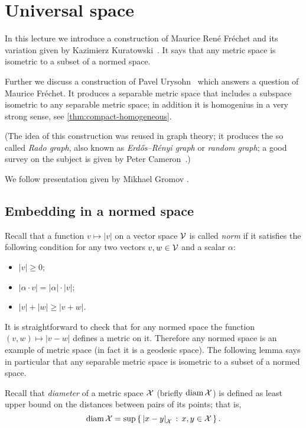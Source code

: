 \chapter{Universal space}

In this lecture we introduce a construction of Maurice René Fréchet \cite{frechet} and its variation given by Kazimierz Kuratowski~\cite{kuratowski}.
It says that any metric space is isometric to a subset of a normed space.

Further we discuss a construction of Pavel Urysohn~\cite{urysohn} which answers a question of Maurice Fréchet.
It produces a separable metric space that includes a subspace  isometric to any separable metric space; in addition it is homogenius in a very strong sense, see \ref{thm:compact-homogeneous}.

(The idea of this construction was reused in graph theory; it produces the so called \emph{Rado graph},
also known as \emph{Erd\H{o}s–R\'enyi graph} or \emph{random graph}; a good survey on the subject is given by Peter Cameron~\cite{cameron}.)

We follow presentation given by Mikhael Gromov \cite{gromov-2007}.

\section{Embedding in a normed space}

Recall that a function $v\mapsto |v|$ on a vector space $\mathcal{V}$ is called \emph{norm} if it satisfies the following condition for any two vectors $v,w\in \mathcal{V}$ and a scalar $\alpha$:
\begin{itemize}
\item $|v|\ge 0$;
\item $|\alpha\cdot v|=|\alpha|\cdot |v|$;
\item $|v|+|w|\ge|v+w|$.
\end{itemize}

It is straightforward to check that for any normed space the function $(v,w)\mapsto |v-w|$ defines a metric on it.
Therefore any normed space is an example of metric space (in fact it is a geodesic space).
The following lemma says in particular that any separable metric space is isometric to a subset of a normed space.

Recall that \emph{diameter} of a metric space $\mathcal{X}$ (briefly $\operatorname{\rm diam}\nolimits \mathcal{X}$) is defined as least upper bound on the distances between pairs of its points;
that is,
\[\diam \spc{X}=\sup\set{\dist{x}{y}{\spc{X}}}{x,y\in \spc{X}}.\]

